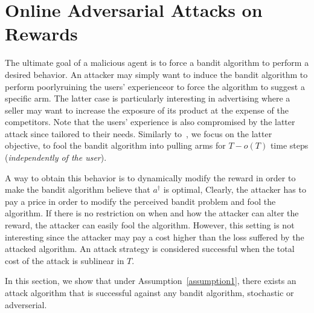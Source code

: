 \section{Online Adversarial Attacks on Rewards}\label{sec:attacks_rewards}
The ultimate goal of a malicious agent is to force a bandit algorithm to perform a desired behavior. An attacker may simply want to induce the bandit algorithm to perform poorly\textemdash ruining the users' experience\textemdash or to force the algorithm to suggest a specific arm. The latter case is particularly interesting in advertising where a seller may want to increase the exposure of its product at the expense of the competitors. Note that the users' experience is also compromised by the latter attack since  tailored to their needs.
Similarly to~\cite{liu2019data,jun2018adversarial}, we focus on the latter objective, \ie to fool the bandit algorithm into pulling arms  for $T-o(T)$ time steps (\emph{independently of the user}).

A way to obtain this behavior is to dynamically modify the reward in order to make the bandit algorithm believe that $a^\dagger$ is optimal, 
Clearly, the attacker has to pay a price in order to modify the perceived bandit problem and fool the algorithm.
If there is no restriction on when and how the attacker can alter the reward, the attacker can easily fool the algorithm.
However, this setting is not interesting since the attacker may pay a cost higher than the loss suffered by the attacked algorithm. An attack strategy is considered successful when the total cost of the attack is sublinear in $T$.

In this section, we show that under Assumption~\ref{assumption1}, there exists an attack algorithm that is successful against any bandit algorithm, stochastic or adverserial.

